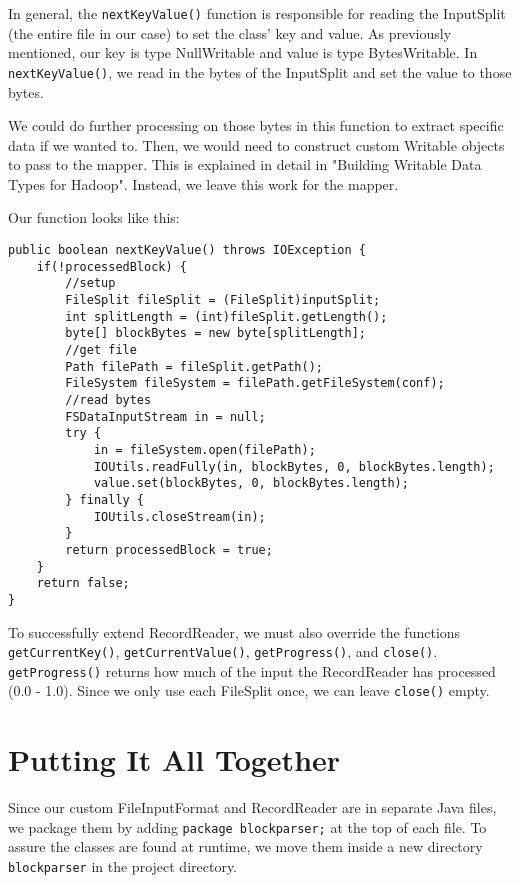\documentclass[9pt,twocolumn,twoside]{idsi}
\begin{document}
In general, the \lstinline{nextKeyValue()} function is responsible for reading the InputSplit (the entire file in our case) to set the class' key and value. As previously mentioned, our key is type NullWritable and value is type BytesWritable. In \lstinline{nextKeyValue()}, we read in the bytes of the InputSplit and set the value to those bytes.

We could do further processing on those bytes in this function to extract specific data if we wanted to. Then, we would need to construct custom Writable objects to pass to the mapper. This is explained in detail in "Building Writable Data Types for Hadoop". Instead, we leave this work for the mapper.

Our function looks like this:

\begin{lstlisting}
public boolean nextKeyValue() throws IOException {
    if(!processedBlock) {
        //setup
        FileSplit fileSplit = (FileSplit)inputSplit;
        int splitLength = (int)fileSplit.getLength();
        byte[] blockBytes = new byte[splitLength];
        //get file
        Path filePath = fileSplit.getPath();
        FileSystem fileSystem = filePath.getFileSystem(conf);
        //read bytes
        FSDataInputStream in = null;
        try {
            in = fileSystem.open(filePath);
            IOUtils.readFully(in, blockBytes, 0, blockBytes.length);
            value.set(blockBytes, 0, blockBytes.length);
        } finally {
            IOUtils.closeStream(in);
        }
        return processedBlock = true;
    }
    return false;
}
\end{lstlisting}

To successfully extend RecordReader, we must also override the functions \lstinline{getCurrentKey()}, \lstinline{getCurrentValue()}, \lstinline{getProgress()}, and \lstinline{close()}. \lstinline{getProgress()} returns how much of the input the RecordReader has processed (0.0 - 1.0). Since we only use each FileSplit once, we can leave \lstinline{close()} empty.

\section{Putting It All Together}

Since our custom FileInputFormat and RecordReader are in separate Java files, we package them by adding \lstinline{package blockparser;} at the top of each file. To assure the classes are found at runtime, we move them inside a new directory \lstinline{blockparser} in the project directory.
\end{document}

